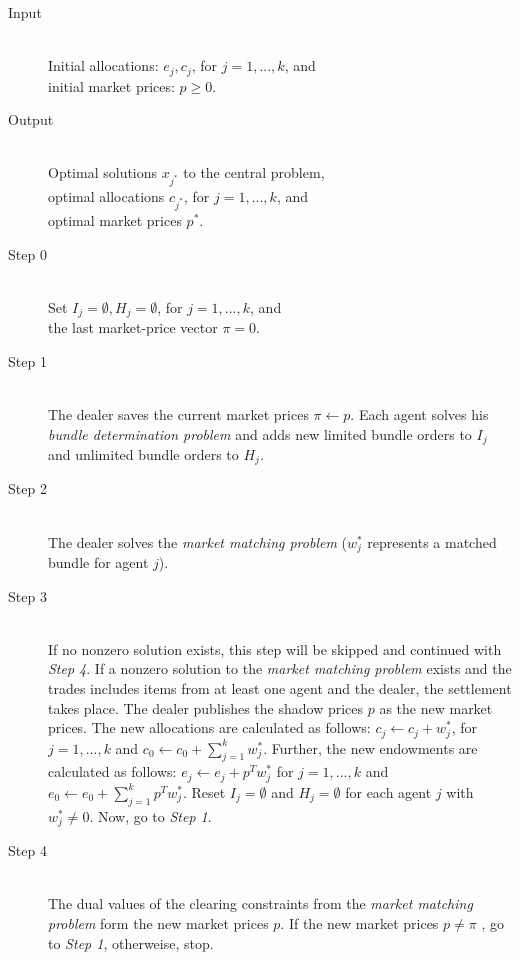 \begin{description}
    \item[Input] \hfill \\
        Initial allocations: $e_{j}, c_{j}$, for $j=1,...,k$, and \\
        initial market prices: $p \geq 0$.
    \item[Output] \hfill \\
        Optimal solutions $x_{j^{*}}$ to the central problem, \\
        optimal allocations $c_{j^{*}}$, for $j=1,...,k$, and \\
        optimal market prices $p^{*}$.
    \item[Step 0] \hfill \\
        Set $I_{j} = \emptyset, H_{j} = \emptyset$, for $j=1,...,k$, and \\
        the last market-price vector $\pi = 0$.
    \item[Step 1] \hfill \\
        The dealer saves the current market prices $\pi \leftarrow p$. Each agent solves his 
        \textit{bundle determination problem} and adds new limited bundle orders to $I_{j}$ and 
        unlimited bundle orders to $H_{j}$.
    \item[Step 2] \hfill \\
        The dealer solves the \textit{market matching problem} ($w_{j}^{*}$ represents a matched bundle for agent $j$). 
    \item[Step 3] \hfill \\
        If no nonzero solution exists, this step will be skipped and continued with \textit{Step 4}.
        If a nonzero solution to the \textit{market matching problem} exists and the trades includes items from at least
        one agent and the dealer, the settlement takes place. 
        The dealer publishes the shadow prices $p$ as the new market prices.
        The new allocations are calculated as follows:
        $c_{j} \leftarrow c_{j} + w_{j}^{*}$, for $j=1,...,k$ and $c_{0} \leftarrow c_{0} + \sum\limits_{j=1}^{k} w_{j}^{*}$.
        Further, the new endowments are calculated as follows:
        $e_{j} \leftarrow e_{j} + p^{T} w_{j}^{*}$ for $j=1,...,k$ and $e_{0} \leftarrow e_{0} + \sum\limits_{j=1}^{k} p^{T} w_{j}^{*}$.
        Reset $I_{j} =  \emptyset$ and $H_{j} = \emptyset$ for each agent $j$ with $w_{j}^{*} \neq 0$.
        Now, go to \textit{Step 1}. 
    \item[Step 4] \hfill \\
        The dual values of the clearing constraints from the \textit{market matching problem} form the new market prices $p$. 
        If the new market prices $p \neq \pi$ , go to \textit{Step 1}, otherweise, stop.
\end{description}


